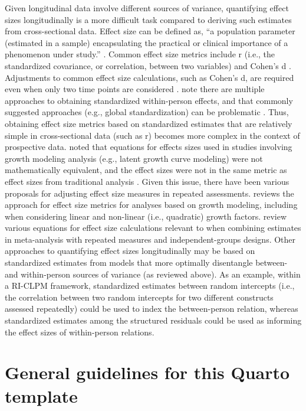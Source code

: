\documentclass[
  10pt,
  letterpaper,
]{article}
\begin{document}
Given longitudinal data involve different sources of variance,
quantifying effect sizes longitudinally is a more difficult task
compared to deriving such estimates from cross-sectional data. Effect
size can be defined as, ``a population parameter (estimated in a sample)
encapsulating the practical or clinical importance of a phenomenon under
study.'' \citep{kraemer2014}. Common effect size metrics include r
(i.e., the standardized covariance, or correlation, between two
variables) and Cohen's d \citep{cohen1988}. Adjustments to common effect
size calculations, such as Cohen's d, are required even when only two
time points are considered \citep[e.g., see][]{morris2002}.
\citet{wang2019a} note there are multiple approaches to obtaining
standardized within-person effects, and that commonly suggested
approaches (e.g., global standardization) can be problematic
\citep[see][for more details]{wang2019a}. Thus, obtaining effect size
metrics based on standardized estimates that are relatively simple in
cross-sectional data (such as r) becomes more complex in the context of
prospective data. \citet{feingold2009} noted that equations for effects
sizes used in studies involving growth modeling analysis (e.g., latent
growth curve modeling) were not mathematically equivalent, and the
effect sizes were not in the same metric as effect sizes from
traditional analysis \citep[see][for more details]{feingold2009}. Given
this issue, there have been various proposals for adjusting effect size
measures in repeated assessments. \citet{feingold2019} reviews the
approach for effect size metrics for analyses based on growth modeling,
including when considering linear and non-linear (i.e., quadratic)
growth factors. \citet{morris2002} review various equations for effect
size calculations relevant to when combining estimates in meta-analysis
with repeated measures and independent-groups designs. Other approaches
to quantifying effect sizes longitudinally may be based on standardized
estimates from models that more optimally disentangle between- and
within-person sources of variance (as reviewed above). As an example,
within a RI-CLPM framework, standardized estimates between random
intercepts (i.e., the correlation between two random intercepts for two
different constructs assessed repeatedly) could be used to index the
between-person relation, whereas standardized estimates among the
structured residuals could be used as informing the effect sizes of
within-person relations.

\hypertarget{general-guidelines-for-this-quarto-template}{%
\section{General guidelines for this Quarto
template}\label{general-guidelines-for-this-quarto-template}}
\end{document}
